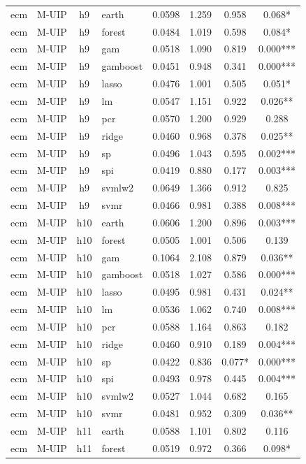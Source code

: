 \begin{ThreePartTable}
\begin{longtable}[t]{llclcccc}
\addlinespace
ecm & M-UIP & h9 & earth & 0.0598 & 1.259 & 0.958 & 0.068*\\
ecm & M-UIP & h9 & forest & 0.0484 & 1.019 & 0.598 & 0.084*\\
ecm & M-UIP & h9 & gam & 0.0518 & 1.090 & 0.819 & 0.000***\\
ecm & M-UIP & h9 & gamboost & 0.0451 & 0.948 & 0.341 & 0.000***\\
ecm & M-UIP & h9 & lasso & 0.0476 & 1.001 & 0.505 & 0.051*\\
ecm & M-UIP & h9 & lm & 0.0547 & 1.151 & 0.922 & 0.026**\\
ecm & M-UIP & h9 & pcr & 0.0570 & 1.200 & 0.929 & 0.288\\
ecm & M-UIP & h9 & ridge & 0.0460 & 0.968 & 0.378 & 0.025**\\
ecm & M-UIP & h9 & sp & 0.0496 & 1.043 & 0.595 & 0.002***\\
ecm & M-UIP & h9 & spi & 0.0419 & 0.880 & 0.177 & 0.003***\\
ecm & M-UIP & h9 & svmlw2 & 0.0649 & 1.366 & 0.912 & 0.825\\
ecm & M-UIP & h9 & svmr & 0.0466 & 0.981 & 0.388 & 0.008***\\
\addlinespace
ecm & M-UIP & h10 & earth & 0.0606 & 1.200 & 0.896 & 0.003***\\
ecm & M-UIP & h10 & forest & 0.0505 & 1.001 & 0.506 & 0.139\\
ecm & M-UIP & h10 & gam & 0.1064 & 2.108 & 0.879 & 0.036**\\
ecm & M-UIP & h10 & gamboost & 0.0518 & 1.027 & 0.586 & 0.000***\\
ecm & M-UIP & h10 & lasso & 0.0495 & 0.981 & 0.431 & 0.024**\\
ecm & M-UIP & h10 & lm & 0.0536 & 1.062 & 0.740 & 0.008***\\
ecm & M-UIP & h10 & pcr & 0.0588 & 1.164 & 0.863 & 0.182\\
ecm & M-UIP & h10 & ridge & 0.0460 & 0.910 & 0.189 & 0.004***\\
ecm & M-UIP & h10 & sp & 0.0422 & 0.836 & 0.077* & 0.000***\\
ecm & M-UIP & h10 & spi & 0.0493 & 0.978 & 0.445 & 0.004***\\
ecm & M-UIP & h10 & svmlw2 & 0.0527 & 1.044 & 0.682 & 0.165\\
ecm & M-UIP & h10 & svmr & 0.0481 & 0.952 & 0.309 & 0.036**\\
\addlinespace
ecm & M-UIP & h11 & earth & 0.0588 & 1.101 & 0.802 & 0.116\\
ecm & M-UIP & h11 & forest & 0.0519 & 0.972 & 0.366 & 0.098*\\

\end{longtable}
\end{ThreePartTable}

